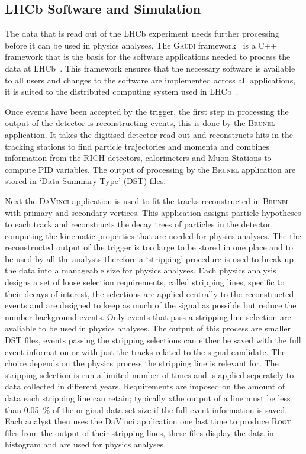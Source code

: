 \subsection{LHCb Software and Simulation}
\label{Software_Simulation}

The data that is read out of the LHCb experiment needs further processing before it can be used in physics analyses. The \textsc{Gaudi} framework~\cite{Mato:1998gfa} is a C++ framework that is the basis for the software applications needed to process the data at LHCb~\cite{Antunes-Nobrega:835156}. This framework ensures that the necessary software is available to all users and changes to the software are implemented across all applications, it is suited to the distributed computing system used in LHCb~\cite{Stagni:2012rs}. 


Once events have been accepted by the trigger, the first step in processing the output of the detector is reconstructing events, this is done by the \textsc{Brunel} application. It takes the digitised detector read out and reconstructs hits in the tracking stations to find particle trajectories and momenta and combines information from the RICH detectors, calorimeters and Muon Stations to compute PID variables. The output of processing by the \textsc{Brunel} application are stored in `Data Summary Type' (DST) files. 

Next the \textsc{DaVinci} application is used to fit the tracks reconstructed in \textsc{Brunel} with primary and secondary vertices. This application assigns particle hypotheses to each track and reconstructs the decay trees of particles in the detector, computing the kinematic properties that are needed for physics analyses. The the reconstructed output of the trigger is too large to be stored in one place and to be used by all the analysts therefore a `stripping' procedure is used to break up the data into a manageable size for physics analyses. Each physics analysis designs a set of loose selection requirements, called stripping lines, specific to their decays of interest, the selections are applied centrally to the reconstructed events and are designed to keep as much of the signal as possible but reduce the number background events. Only events that pass a stripping line selection are avaliable to be used in physics analyses. The output of this process are smaller DST files, events passing the stripping selections can either be saved with the full event information or with just the tracks related to the signal candidate. The choice depends on the physics process the stripping line is relevant for. The stripping selection is run a limited number of times and is applied seperately to data collected in different years. Requirements are imposed on the amount of data each stripping line can retain; typically xthe output of a line must be less than 0.05~$\%$ of the original data set size if the full event information is saved. Each analyst then uses the DaVinci application one last time to produce \textsc{Root}~\cite{Brun:1997pa} files from the output of their stripping lines, these files display the data in histogram and are used for physics analyses. %


